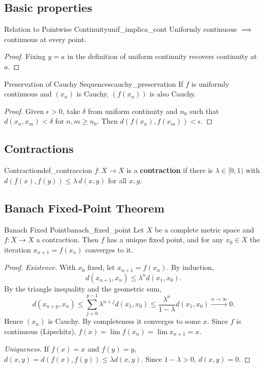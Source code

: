 \documentclass[11pt, a4paper]{article}
\begin{document}
\subsection{Basic properties}

\begin{proposicion}{Relation to Pointwise Continuity}{unif_implica_cont}
Uniformly continuous $\implies$ continuous at every point.
\end{proposicion}

\begin{proof}
Fixing $y = a$ in the definition of uniform continuity recovers continuity at $a$.
\end{proof}

\begin{proposicion}{Preservation of Cauchy Sequences}{cauchy_preservation}
If $f$ is uniformly continuous and $(x_n)$ is Cauchy, $(f(x_n))$ is also Cauchy.
\end{proposicion}

\begin{proof}
Given $\epsilon > 0$, take $\delta$ from uniform continuity and $n_0$ such that
$d(x_n, x_m) < \delta$ for $n, m \ge n_0$. Then $d(f(x_n), f(x_m)) < \epsilon$.
\end{proof}

\subsection{Contractions}

\begin{definicion}{Contraction}{def_contraccion}
$f: X \to X$ is a \textbf{contraction} if there is $\lambda \in [0, 1)$ with
$d(f(x), f(y)) \le \lambda\, d(x, y)$ for all $x, y$.
\end{definicion}

\subsection{Banach Fixed-Point Theorem}

\begin{teorema}{Banach Fixed Point}{banach_fixed_point}
Let $X$ be a complete metric space and $f: X \to X$ a contraction. Then $f$ has a unique fixed
point, and for any $x_0 \in X$ the iteration $x_{n+1} = f(x_n)$ converges to it.
\end{teorema}

\begin{proof}
\textit{Existence.} With $x_0$ fixed, let $x_{n+1} = f(x_n)$. By induction,
$$ d(x_{n+1}, x_n) \le \lambda^n d(x_1, x_0). $$
By the triangle inequality and the geometric sum,
$$ d(x_{n+p}, x_n) \le \sum_{j=0}^{p-1} \lambda^{n+j} d(x_1, x_0) \le \frac{\lambda^n}{1-\lambda}
d(x_1, x_0) \xrightarrow{n \to \infty} 0. $$
Hence $(x_n)$ is Cauchy. By completeness it converges to some $x$. Since $f$ is continuous
(Lipschitz), $f(x) = \lim f(x_n) = \lim x_{n+1} = x$.

\textit{Uniqueness.} If $f(x) = x$ and $f(y) = y$, $d(x, y) = d(f(x), f(y)) \le \lambda d(x, y)$. Since
$1 - \lambda > 0$, $d(x, y) = 0$.
\end{proof}
\end{document}
